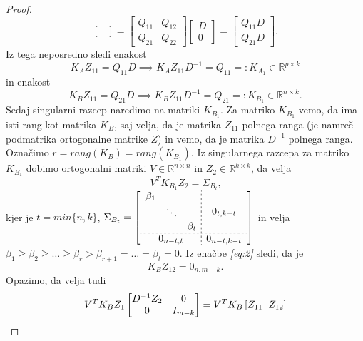 \documentclass[mat1]{article}
\theoremstyle{definition}
\begin{document}
\begin{proof}
$$\begin{bmatrix}
\end{bmatrix} = 
\begin{bmatrix}
Q_{11} & Q_{12} \\ 
Q_{21} & Q_{22}
\end{bmatrix}
\begin{bmatrix}
D \\ 
0
\end{bmatrix} =
\begin{bmatrix}
Q_{11} D \\ 
Q_{21} D
\end{bmatrix} \text{.}
$$
Iz tega neposredno sledi enakost
$$
K_A Z_{11} = Q_{11} D \implies K_A Z_{11} D^{-1} = Q_{11} =: K_{A_1}  \in \mathbb{R}^{p \times k} %
$$
in enakost
$$
K_B Z_{11} = Q_{21} D \implies K_B Z_{11} D^{-1} = Q_{21} =: K_{B_1} \in \mathbb{R}^{ n \times k} \text{.}
$$
Sedaj singularni razcep naredimo na matriki $K_{B_1}$. Za matriko $K_{B_1}$ vemo, da ima isti rang kot matrika $K_B$, saj velja, da je matrika $Z_{11}$ polnega ranga (je namreč podmatrika ortogonalne matrike $Z$) in vemo, da je matrika $D^{-1}$ polnega ranga. Označimo $r = rang(K_B) = rang(K_{B_1})$. Iz singularnega razcepa za matriko $K_{B_1}$ dobimo ortogonalni matriki $V \in \mathbb{R}^{ n \times n}$ in $Z_2 \in \mathbb{R}^{ k \times k}$, da velja
\begin{equation}
V^T K_{B_1} Z_2 = \Sigma_{B_t}
 \text{,}  \label{eq:3}
\end{equation}
kjer je $t = min\{n, k\}$, 
$\Sigma_{B_t} = 
\left[
\begin{array}{c;{2pt/2pt}c}
\begin{matrix}
\beta_1 & & \\
 & \ddots & \\
 & & \beta_t
\end{matrix} & 0_{t, k - t}
 \\ \hdashline[2pt/2pt]
0_{n-t, t} & 0_{n-t, k-t}
\end{array} \right]$
in velja 
$ \beta_1 \geq \beta_2 \geq \ldots \geq \beta_r > \beta_{r+1} = \ldots = \beta_t = 0 \text{.}$ 
\newline
Iz enačbe \textit{\eqref{eq:2}} sledi, da je
$$
K_B Z_{12} = 0_{n, m-k} \text{.}
$$
Opazimo, da velja tudi
\begin{gather*}
V^T K_B Z_1
\begin{bmatrix}
D^{-1} Z_2 & 0\\ 
0 & I_{m-k}
\end{bmatrix} = 
V^T K_B \left[ Z_{11} \hspace{2mm} Z_{12} \right]

\end{gather*}
\end{proof}
\end{document}
